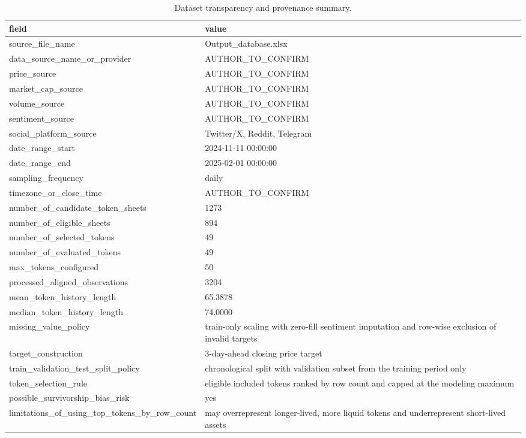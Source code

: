 \begin{table}[htbp]
\centering
\begin{tabular}{ll}
\hline
field & value \\
\hline
source_file_name & Output_database.xlsx \\
data_source_name_or_provider & AUTHOR_TO_CONFIRM \\
price_source & AUTHOR_TO_CONFIRM \\
market_cap_source & AUTHOR_TO_CONFIRM \\
volume_source & AUTHOR_TO_CONFIRM \\
sentiment_source & AUTHOR_TO_CONFIRM \\
social_platform_source & Twitter/X, Reddit, Telegram \\
date_range_start & 2024-11-11 00:00:00 \\
date_range_end & 2025-02-01 00:00:00 \\
sampling_frequency & daily \\
timezone_or_close_time & AUTHOR_TO_CONFIRM \\
number_of_candidate_token_sheets & 1273 \\
number_of_eligible_sheets & 894 \\
number_of_selected_tokens & 49 \\
number_of_evaluated_tokens & 49 \\
max_tokens_configured & 50 \\
processed_aligned_observations & 3204 \\
mean_token_history_length & 65.3878 \\
median_token_history_length & 74.0000 \\
missing_value_policy & train-only scaling with zero-fill sentiment imputation and row-wise exclusion of invalid targets \\
target_construction & 3-day-ahead closing price target \\
train_validation_test_split_policy & chronological split with validation subset from the training period only \\
token_selection_rule & eligible included tokens ranked by row count and capped at the modeling maximum \\
possible_survivorship_bias_risk & yes \\
limitations_of_using_top_tokens_by_row_count & may overrepresent longer-lived, more liquid tokens and underrepresent short-lived assets \\
\hline
\end{tabular}
\caption{Dataset transparency and provenance summary.}
\label{table_dataset_transparency}
\end{table}